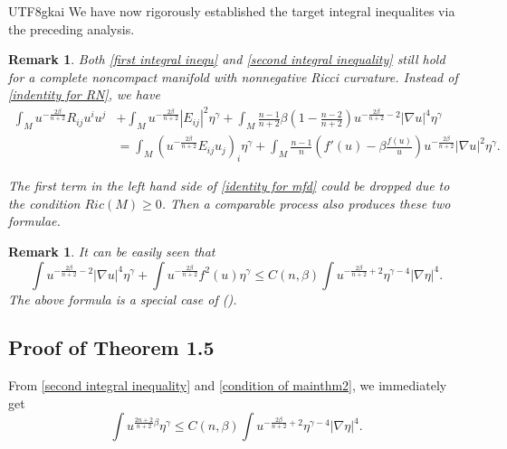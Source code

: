 \documentclass[reqno,12pt]{amsart}
\numberwithin{equation}{section}
\newtheorem{rmk}[thm]{Remark}
\begin{document}
\begin{CJK}{UTF8}{gkai}
   We have now rigorously established the target integral inequalites via the preceding analysis.
   \begin{rmk}\label{rmk4.1}
   	Both \eqref{first integral inequ} and \eqref{second integral inequality} still hold for a complete noncompact manifold with nonnegative Ricci curvature. Instead of \eqref{indentity for RN}, we have
   	\begin{equation}\label{identity for mfd}
   		\begin{aligned}
   			\int_{M}u^{-\frac{2\beta}{n+2}}R_{ij}u^{i}u^{j}&+\int_{M}u^{-\frac{2\beta}{n+2}}|E_{ij}|^{2}\eta^{\gamma}+\int_{M}\frac{n-1}{n+2}\beta\left(1-\frac{n-2}{n+2}\right)u^{-\frac{2\beta}{n+2}-2}|\nabla u|^{4}\eta^{\gamma}\\
   			&=\int_{M}\left(u^{-\frac{2\beta}{n+2}}E_{ij}u_{j}\right)_{i}\eta^{\gamma}+\int_{M}\frac{n-1}{n}\left(f'(u)-\beta\frac{f(u)}{u}\right)u^{-\frac{2\beta}{n+2}}|\nabla u|^{2}\eta^{\gamma}.
   		\end{aligned}
   	\end{equation}
   	
   	The first term in the left hand side of \eqref{identity for mfd} could be dropped due to the condition $Ric(M)\ge 0$. Then a comparable process also produces these two formulae.
   \end{rmk}
   \begin{rmk}
   	It can be easily seen that
   	\begin{equation*}
   			\int u^{-\frac{2\beta}{n+2}-2}|\nabla u|^{4}\eta^{\gamma}+\int u^{-\frac{2\beta}{n+2}} f^{2}(u)\eta^{\gamma}\le C(n,\beta)\int  u^{-\frac{2\beta}{n+2}+2}\eta^{\gamma-4}|\nabla \eta|^{4}.
   	\end{equation*}
   	 The above formula is a special case of \rm(\hspace{-0.03em}\cite[Lemma 5.3]{he2025optimalliouvilletheoremslaneemden}).
   \end{rmk}
   \subsection{Proof of Theorem 1.5} From \eqref{second integral inequality} and \eqref{condition of mainthm2}, we immediately get
   \begin{equation}\label{integrate estimate for thm1.4}
   			\int u^{\frac{2n+2}{n+2}\beta} \eta^{\gamma}\le C(n,\beta)\int  u^{-\frac{2\beta}{n+2}+2}\eta^{\gamma-4}|\nabla \eta|^{4}.
   \end{equation}
   

\end{CJK}
\end{document}
